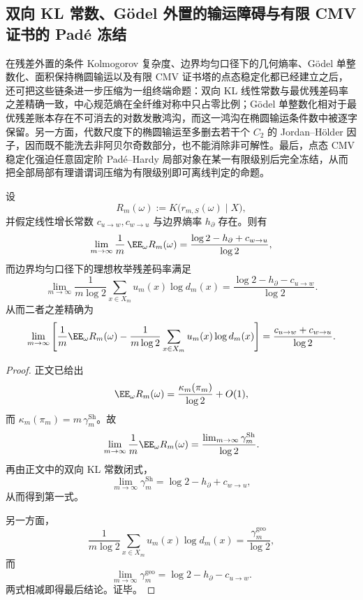 \subsection{双向 KL 常数、Gödel 外置的输运障碍与有限 CMV 证书的 Pad\'e 冻结}\label{subsec:conclusion-godel-transport-cmv-freezing-complexity-gap}
在残差外置的条件 Kolmogorov 复杂度、边界均匀口径下的几何熵率、Gödel 单整数化、面积保持椭圆输运以及有限 CMV 证书塔的点态稳定化都已经建立之后，还可把这些链条进一步压缩为一组终端命题：双向 KL 线性常数与最优残差码率之差精确一致，中心规范熵在全纤维对称中只占零比例；Gödel 单整数化相对于最优残差账本存在不可消去的对数发散鸿沟，而这一鸿沟在椭圆输运条件数中被逐字保留。另一方面，代数尺度下的椭圆输运至多删去若干个 \(C_2\) 的 Jordan--Hölder 因子，因而既不能洗去非阿贝尔奇数部分，也不能消除非可解性。最后，点态 CMV 稳定化强迫任意固定阶 Pad\'e--Hardy 局部对象在某一有限级别后完全冻结，从而把全部局部有理谱谓词压缩为有限级别即可离线判定的命题。

\begin{theorem}[双 KL 常数与残差条件复杂度密度的同一律]\label{thm:conclusion-double-kl-residual-conditional-complexity-identity}
设
\[
R_m(\omega):=K\!\bigl(r_{m,S}(\omega)\mid X\bigr),
\]
并假定线性增长常数 \(c_{u\to w},c_{w\to u}\) 与边界熵率 \(h_\partial\) 存在。则有
\[
\lim_{m\to\infty}\frac1m\,\EE_\omega R_m(\omega)
=
\frac{\log 2-h_\partial+c_{w\to u}}{\log 2},
\]
而边界均匀口径下的理想枚举残差码率满足
\[
\lim_{m\to\infty}\frac{1}{m\log 2}\sum_{x\in X_m}u_m(x)\log d_m(x)
=
\frac{\log 2-h_\partial-c_{u\to w}}{\log 2}.
\]
从而二者之差精确为
\[
\lim_{m\to\infty}\left[
\frac1m\EE_\omega R_m(\omega)
-
\frac{1}{m\log 2}\sum_{x\in X_m}u_m(x)\log d_m(x)
\right]
=
\frac{c_{u\to w}+c_{w\to u}}{\log 2}.
\]
\end{theorem}
\begin{proof}
正文已给出
\[
\EE_\omega R_m(\omega)=\frac{\kappa_m(\pi_m)}{\log 2}+O(1),
\]
而 \(\kappa_m(\pi_m)=m\,\gamma_m^{\mathrm{Sh}}\)。故
\[
\lim_{m\to\infty}\frac1m\EE_\omega R_m(\omega)
=
\frac{\lim_{m\to\infty}\gamma_m^{\mathrm{Sh}}}{\log 2}.
\]
再由正文中的双向 KL 常数闭式，
\[
\lim_{m\to\infty}\gamma_m^{\mathrm{Sh}}
=
\log 2-h_\partial+c_{w\to u},
\]
从而得到第一式。

另一方面，
\[
\frac{1}{m\log 2}\sum_{x\in X_m}u_m(x)\log d_m(x)
=
\frac{\gamma_m^{\mathrm{geo}}}{\log 2},
\]
而
\[
\lim_{m\to\infty}\gamma_m^{\mathrm{geo}}
=
\log 2-h_\partial-c_{u\to w}.
\]
两式相减即得最后结论。证毕。
\end{proof}

